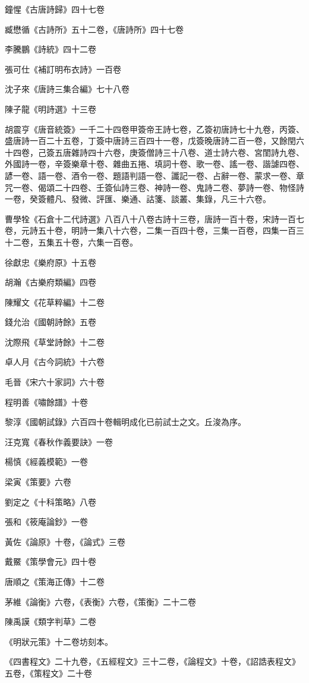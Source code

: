 鐘惺《古唐詩歸》四十七卷

臧懋循《古詩所》五十二卷，《唐詩所》四十七卷

李騰鵬《詩統》四十二卷

張可仕《補訂明布衣詩》一百卷

沈子來《唐詩三集合編》七十八卷

陳子龍《明詩選》十三卷

胡震亨《唐音統簽》一千二十四卷甲簽帝王詩七卷，乙簽初唐詩七十九卷，丙簽、盛唐詩一百二十五卷，丁簽中唐詩三百四十一卷，戊簽晚唐詩二百一卷，又餘閏六十四卷，己簽五唐雜詩四十六卷，庚簽僧詩三十八卷、道士詩六卷、宮閨詩九卷、外國詩一卷，辛簽樂章十卷、雜曲五捲、填詞十卷、歌一卷、謠一卷、諧謔四卷、諺一卷、語一卷、酒令一卷、題語判語一卷、讖記一卷、占辭一卷、蒙求一卷、章咒一卷、偈頌二十四卷、壬簽仙詩三卷、神詩一卷、鬼詩二卷、夢詩一卷、物怪詩一卷，癸簽體凡、發微、評匯、樂通、詁箋、談叢、集錄，凡三十六卷。

曹學牷《石倉十二代詩選》八百八十八卷古詩十三卷，唐詩一百十卷，宋詩一百七卷，元詩五十卷，明詩一集八十六卷，二集一百四十卷，三集一百卷，四集一百三十二卷，五集五十卷，六集一百卷。

徐獻忠《樂府原》十五卷

胡瀚《古樂府類編》四卷

陳耀文《花草粹編》十二卷

錢允治《國朝詩餘》五卷

沈際飛《草堂詩餘》十二卷

卓人月《古今詞統》十六卷

毛晉《宋六十家詞》六十卷

程明善《嘯餘譜》十卷

黎淳《國朝試錄》六百四十卷輯明成化已前試士之文。丘浚為序。

汪克寬《春秋作義要訣》一卷

楊慎《經義模範》一卷

梁寅《策要》六卷

劉定之《十科策略》八卷

張和《筱庵論鈔》一卷

黃佐《論原》十卷，《論式》三卷

戴鱀《策學會元》四十卷

唐順之《策海正傳》十二卷

茅維《論衡》六卷，《表衡》六卷，《策衡》二十二卷

陳禹謨《類字判草》二卷

《明狀元策》十二卷坊刻本。

《四書程文》二十九卷，《五經程文》三十二卷，《論程文》十卷，《詔誥表程文》五卷，《策程文》二十卷

